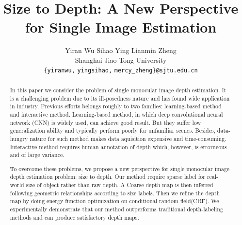 \documentclass[10pt,twocolumn,letterpaper]{article}
\begin{document}
\title{Size to Depth: A New Perspective for Single Image Estimation}

\author{Yiran Wu \hspace{2cm} Sihao Ying \hspace{2cm} Lianmin Zheng\\
Shanghai Jiao Tong University\\
{\tt\small \{yiranwu,}
{\tt\small yingsihao,}
{\tt\small mercy\_zheng\}@sjtu.edu.cn}
}

\maketitle
\ifwacvfinal\thispagestyle{empty}\fi

\begin{abstract}
   
In this paper we consider the problem of single monocular image depth estimation. It is a challenging problem due to its ill-posedness nature and has found wide application in industry. Previous efforts belongs roughly to two families: learning-based method and interactive method. Learning-based method, in which deep convolutional neural network (CNN) is widely used, can achieve good result. But they suffer low generalization ability and typically perform poorly for unfamiliar scenes. Besides, data-hungry nature for such method makes data aquisition expensive and time-consuming. Interactive method requires human annotation of depth which, however, is errorneous and of large variance.

To overcome these problems, we propose a new perspective for single monocular image depth estimation problem: size to depth. Our method require sparse label for real-world size of object rather than raw depth. A Coarse depth map is then inferred following geometric relationships according to size labels. Then we refine the depth map by doing energy function optimization on conditional random field(CRF). We experimentally demonstrate that our method outperforms traditional depth-labeling methods and can produce satisfactory depth maps.
\end{abstract}
\end{document}
